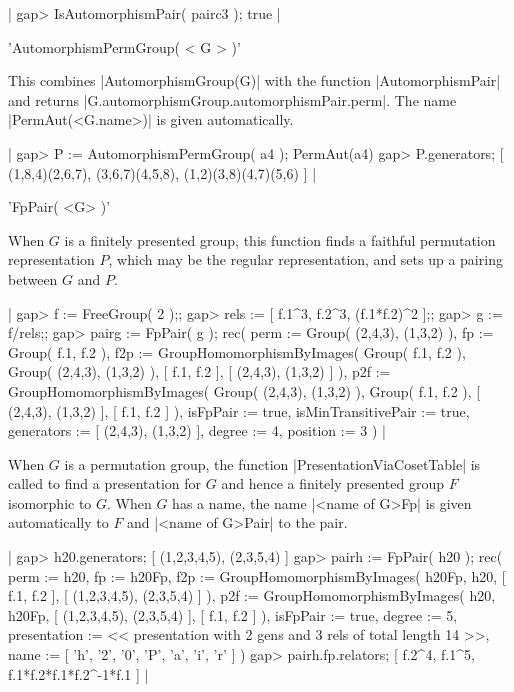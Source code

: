 {|    gap> IsAutomorphismPair( pairc3 );
    true |

%

'AutomorphismPermGroup( < G > )'

This combines |AutomorphismGroup(G)| with the function |AutomorphismPair|
and returns |G.automorphismGroup.automorphismPair.perm|.
The name |PermAut(<G.name>)| is given automatically.

|    gap> P := AutomorphismPermGroup( a4 );
    PermAut(a4)
    gap> P.generators;
    [ (1,8,4)(2,6,7), (3,6,7)(4,5,8), (1,2)(3,8)(4,7)(5,6) ]  |

%

'FpPair( <G> )'

When $G$ is a finitely presented group, this function finds a faithful
permutation representation $P$, which may be the regular representation,
and sets up a pairing between $G$ and $P$.

|    gap> f := FreeGroup( 2 );;
    gap> rels := [ f.1^3, f.2^3, (f.1*f.2)^2 ];;
    gap> g := f/rels;;
    gap> pairg := FpPair( g );
    rec(
      perm := Group( (2,4,3), (1,3,2) ),
      fp := Group( f.1, f.2 ),
      f2p := GroupHomomorphismByImages( Group( f.1, f.2 ), 
        Group( (2,4,3), (1,3,2) ), [ f.1, f.2 ], [ (2,4,3), (1,3,2) ] ),
      p2f := GroupHomomorphismByImages( Group( (2,4,3), (1,3,2) ),
        Group( f.1, f.2 ), [ (2,4,3), (1,3,2) ], [ f.1, f.2 ] ),
      isFpPair := true,
      isMinTransitivePair := true,
      generators := [ (2,4,3), (1,3,2) ],
      degree := 4,
      position := 3 )  |

When $G$ is a permutation group, the function
|PresentationViaCosetTable| is called to find a presentation for $G$
and hence a finitely presented group $F$ isomorphic to $G$.
When $G$ has a name, the name |<name of G>Fp| is given automatically
to $F$ and |<name of G>Pair| to the pair.

|    gap> h20.generators;
    [ (1,2,3,4,5), (2,3,5,4) ]
    gap> pairh := FpPair( h20 );
    rec(
      perm := h20,
      fp := h20Fp,
      f2p := GroupHomomorphismByImages( h20Fp, h20, [ f.1, f.2 ], 
        [ (1,2,3,4,5), (2,3,5,4) ] ),
      p2f := GroupHomomorphismByImages( h20, h20Fp,
        [ (1,2,3,4,5), (2,3,5,4) ], [ f.1, f.2 ] ),
      isFpPair := true,
      degree := 5,
      presentation := << presentation with 2 gens and 3 rels
        of total length 14 >>,
      name := [ 'h', '2', '0', 'P', 'a', 'i', 'r' ] )
    gap> pairh.fp.relators;
    [ f.2^4, f.1^5, f.1*f.2*f.1*f.2^-1*f.1 ]   |


}
